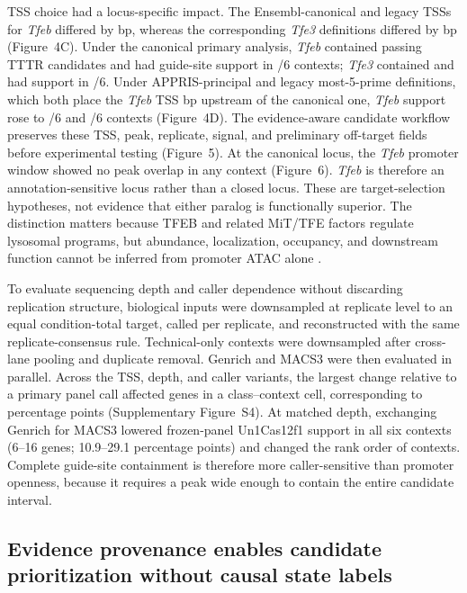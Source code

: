\documentclass[11pt]{article}
\begin{document}
TSS choice had a locus-specific impact. The Ensembl-canonical and legacy TSSs for \textit{Tfeb} differed by \TfebLegacyOffset{} bp, whereas the corresponding \textit{Tfe3} definitions differed by \TfeThreeLegacyOffset{} bp (Figure~4C). Under the canonical primary analysis, \textit{Tfeb} contained \TfebUnPamN{} passing TTTR candidates and had guide-site support in \TfebUnContextsN/6 contexts; \textit{Tfe3} contained \TfeThreeUnPamN{} and had support in \TfeThreeUnContextsN/6. Under APPRIS-principal and legacy most-5-prime definitions, which both place the \textit{Tfeb} TSS \TfebLegacyOffset{} bp upstream of the canonical one, \textit{Tfeb} support rose to \TfebApprisContextsN/6 and \TfebLegacyContextsN/6 contexts (Figure~4D). The evidence-aware candidate workflow preserves these TSS, peak, replicate, signal, and preliminary off-target fields before experimental testing (Figure~5). At the canonical locus, the \textit{Tfeb} promoter window showed no peak overlap in any context (Figure~6). \textit{Tfeb} is therefore an annotation-sensitive locus rather than a closed locus. These are target-selection hypotheses, not evidence that either paralog is functionally superior. The distinction matters because TFEB and related MiT/TFE factors regulate lysosomal programs, but abundance, localization, occupancy, and downstream function cannot be inferred from promoter ATAC alone \citep{sardiello2009gene,settembre2011tfeb,iyer2022lysosomal}.

To evaluate sequencing depth and caller dependence without discarding replication structure, biological inputs were downsampled at replicate level to an equal condition-total target, called per replicate, and reconstructed with the same replicate-consensus rule. Technical-only contexts were downsampled after cross-lane pooling and duplicate removal. Genrich and MACS3 were then evaluated in parallel. Across the TSS, depth, and caller variants, the largest change relative to a primary panel call affected \SensitivityMaxChanged{} genes in a class--context cell, corresponding to \SensitivityMaxDeltaPP{} percentage points (Supplementary Figure~S4). At matched depth, exchanging Genrich for MACS3 lowered frozen-panel Un1Cas12f1 support in all six contexts (6--16 genes; 10.9--29.1 percentage points) and changed the rank order of contexts. Complete guide-site containment is therefore more caller-sensitive than promoter openness, because it requires a peak wide enough to contain the entire candidate interval.

\subsection{Evidence provenance enables candidate prioritization without causal state labels}
\end{document}
